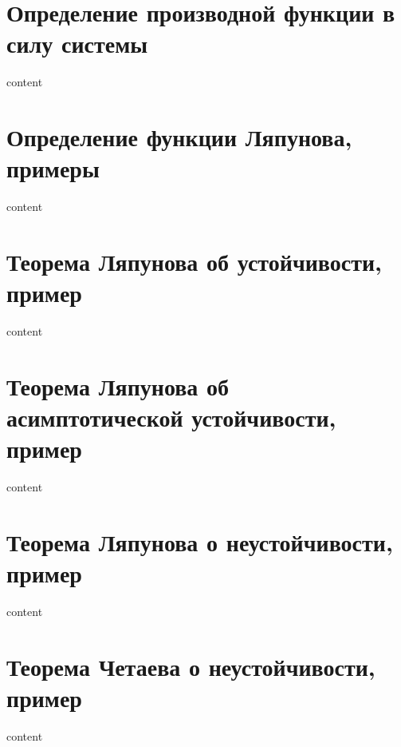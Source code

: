 \section{Определение производной функции в силу системы}

content

\section{Определение функции Ляпунова, примеры}

content

\section{Теорема Ляпунова об устойчивости, пример}

content

\section{Теорема Ляпунова об асимптотической устойчивости, пример}

content

\section{Теорема Ляпунова о неустойчивости, пример}

content

\section{Теорема Четаева о неустойчивости, пример}

content

